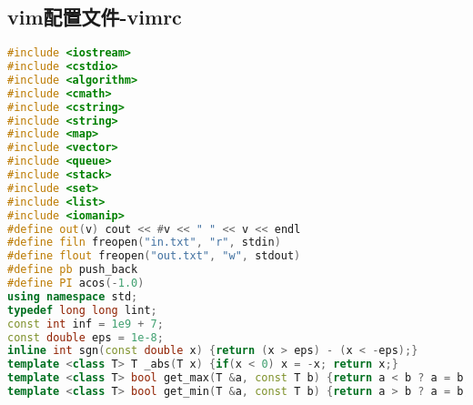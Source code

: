\subsection{vim配置文件-vimrc}
    \begin{lstlisting}[language=c++]
#include <iostream>
#include <cstdio>
#include <algorithm>
#include <cmath>
#include <cstring>
#include <string>
#include <map>
#include <vector>
#include <queue>
#include <stack>
#include <set>
#include <list>
#include <iomanip>
#define out(v) cout << #v << " " << v << endl
#define filn freopen("in.txt", "r", stdin)
#define flout freopen("out.txt", "w", stdout)
#define pb push_back
#define PI acos(-1.0)
using namespace std;
typedef long long lint;
const int inf = 1e9 + 7;
const double eps = 1e-8;
inline int sgn(const double x) {return (x > eps) - (x < -eps);}
template <class T> T _abs(T x) {if(x < 0) x = -x; return x;}
template <class T> bool get_max(T &a, const T b) {return a < b ? a = b, true : false;}
template <class T> bool get_min(T &a, const T b) {return a > b ? a = b, true : false;}
    \end{lstlisting}

